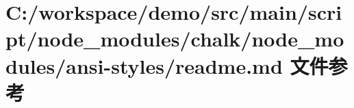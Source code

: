 \hypertarget{node__modules_2chalk_2node__modules_2ansi-styles_2_r_e_a_d_m_e_8md}{}\section{C\+:/workspace/demo/src/main/script/node\+\_\+modules/chalk/node\+\_\+modules/ansi-\/styles/readme.md 文件参考}
\label{node__modules_2chalk_2node__modules_2ansi-styles_2_r_e_a_d_m_e_8md}
